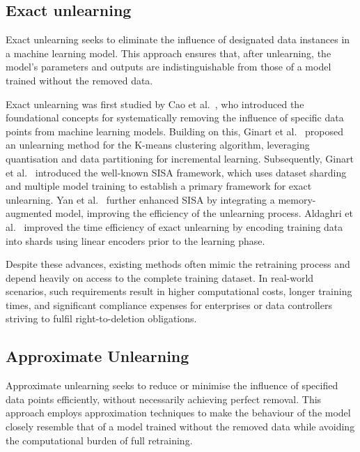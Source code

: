\documentclass[preprint,12pt]{elsarticle}
\begin{document}
\subsection{Exact unlearning}
Exact unlearning seeks to eliminate the influence of designated data instances in a machine learning model. This approach ensures that, after unlearning, the model's parameters and outputs are indistinguishable from those of a model trained without the removed data.

Exact unlearning was first studied by   Cao et al.~\cite{2015Towards}, who introduced the foundational concepts for systematically removing the influence of specific data points from machine learning models. Building on this, Ginart et al.~\cite{ginart2019making} proposed an unlearning method for the K-means clustering algorithm, leveraging quantisation and data partitioning for incremental learning. Subsequently, Ginart et al.~\cite{2021Machine} introduced the well-known SISA framework, which uses dataset sharding and multiple model training to establish a primary framework for exact unlearning. Yan et al.~\cite{yan2022arcane} further enhanced SISA by integrating a memory-augmented model, improving the efficiency of the unlearning process. Aldaghri et al.~\cite{aldaghri2021coded} improved the time efficiency of exact unlearning by encoding training data into shards using linear encoders prior to the learning phase.

Despite these advances, existing methods often mimic the retraining process and depend heavily on access to the complete training dataset. In real-world scenarios, such requirements result in higher computational costs, longer training times, and significant compliance expenses for enterprises or data controllers striving to fulfil right-to-deletion obligations.

\subsection{Approximate Unlearning}
Approximate unlearning seeks to reduce or minimise the influence of specified data points efficiently, without necessarily achieving perfect removal. This approach employs approximation techniques to make the behaviour of the model closely resemble that of a model trained without the removed data while avoiding the computational burden of full retraining.
\end{document}
